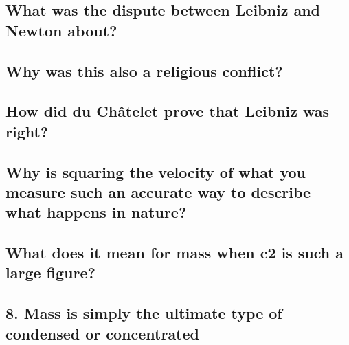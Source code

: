 \subsection*{What was the dispute between Leibniz and Newton about?}

\subsection*{Why was this also a religious conflict?}

\subsection*{How did du Châtelet prove that Leibniz was right?}

\subsection*{Why is squaring the velocity of what you measure such an accurate way to describe
what happens in nature?}

\subsection*{What does it mean for mass when c2 is such a large figure?}

\subsection*{8. Mass is simply the ultimate type of condensed or concentrated}
